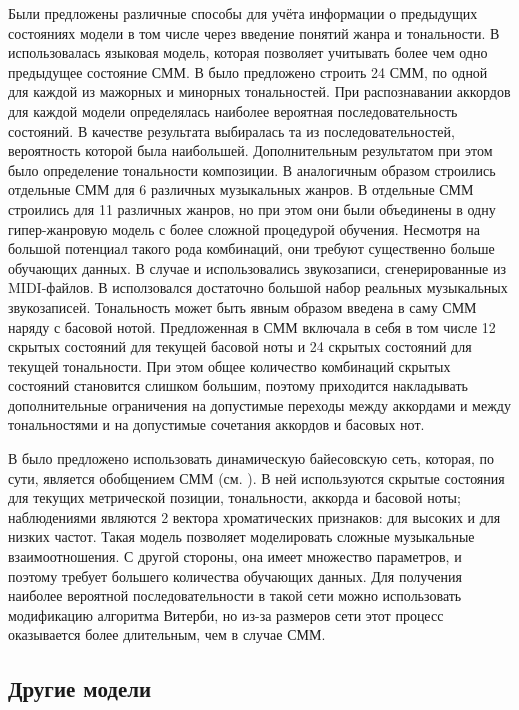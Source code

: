 Были предложены различные способы для учёта информации о предыдущих состояниях
модели в том числе через введение понятий жанра и тональности. В
\cite{Khadkevich2009} использовалась языковая модель, которая позволяет
учитывать более чем одно предыдущее состояние СММ. В \cite{Lee2007} было
предложено строить 24 СММ, по одной для каждой из мажорных и минорных
тональностей. При распознавании аккордов для каждой модели определялась наиболее
вероятная последовательность состояний. В качестве результата выбиралась та из
последовательностей, вероятность которой была наибольшей. Дополнительным
результатом при этом было определение тональности композиции. В \cite{Lee2008}
аналогичным образом строились отдельные СММ для 6 различных музыкальных жанров.
В \cite{Ni2012} отдельные СММ строились для 11 различных жанров, но при этом они
были объединены в одну гипер-жанровую модель с более сложной процедурой
обучения. Несмотря на большой потенциал такого рода комбинаций, они требуют
существенно больше обучающих данных. В случае \cite{Lee2007} и \cite{Lee2008}
использовались звукозаписи, сгенерированные из MIDI-файлов. В \cite{Ni2012}
исползовался достаточно большой набор реальных музыкальных звукозаписей.
Тональность может быть явным образом введена в саму СММ наряду с басовой нотой.
Предложенная в \cite{Ni2011} СММ включала в себя в том числе 12 скрытых
состояний для текущей басовой ноты и 24 скрытых состояний для текущей
тональности. При этом общее количество комбинаций скрытых состояний становится
слишком большим, поэтому приходится накладывать дополнительные ограничения на
допустимые переходы между аккордами и между тональностями и на допустимые
сочетания аккордов и басовых нот.

В \cite{Mauch2010} было предложено использовать динамическую байесовскую сеть,
которая, по сути, является обобщением СММ (см. \cite{Ghahramani2001}). В ней
используются скрытые состояния для текущих метрической позиции, тональности,
аккорда и басовой ноты; наблюдениями являются 2 вектора хроматических признаков:
для высоких и для низких частот. Такая модель позволяет моделировать сложные
музыкальные взаимоотношения. С другой стороны, она имеет множество параметров, и
поэтому требует большего количества обучающих данных. Для получения наиболее
вероятной последовательности в такой сети можно использовать модификацию
алгоритма Витерби, но из-за размеров сети этот процесс оказывается более
длительным, чем в случае СММ.

\subsection{Другие модели}

